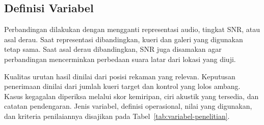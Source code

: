 \subsection{Definisi Variabel}

Perbandingan dilakukan dengan mengganti representasi audio, tingkat SNR, atau asal derau. Saat representasi dibandingkan, kueri dan galeri yang digunakan tetap sama. Saat asal derau dibandingkan, SNR juga disamakan agar perbandingan mencerminkan perbedaan suara latar dari lokasi yang diuji.

Kualitas urutan hasil dinilai dari posisi rekaman yang relevan. Keputusan penerimaan dinilai dari jumlah kueri target dan kontrol yang lolos ambang. Kasus kegagalan diperiksa melalui skor kemiripan, ciri akustik yang tersedia, dan catatan pendengaran. Jenis variabel, definisi operasional, nilai yang digunakan, dan kriteria penilaiannya disajikan pada Tabel~\ref{tab:variabel-penelitian}.

